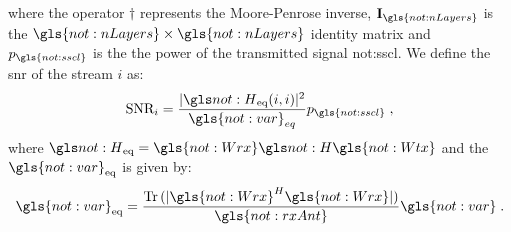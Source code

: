 \noindent where the operator $\dagger$ represents the Moore-Penrose inverse, $\mathbf{ I}_{\gls{not:nLayers}} $ is the $\gls{not:nLayers} \times \gls{not:nLayers}$ identity matrix and $p_{\gls{not:sscl}}$ is the the power of the transmitted signal \gls{not:sscl}.
%
We define the \gls{snr} of the stream $i$ as:
%
\begin{equation}
\label{eq.:snr}
\textrm{SNR}_i = \frac{ \abs{
		\channel_{\textrm{eq}} (i,i)
	}^2 }{\gls{not:var}_{eq}} p_{\gls{not:sscl}} \; ,
\end{equation}
%
where $\channel_{\textrm{eq}} = \gls{not:Wrx} \channel \gls{not:Wtx}$ and the $\gls{not:var}_{\textrm{eq}}$ is given by:
%
\begin{equation}
\gls{not:var}_{\textrm{eq}} = \frac{
	\Tr \,  (\abs{ \gls{not:Wrx}^H \gls{not:Wrx} } )}
{\gls{not:rxAnt}}
\gls{not:var} \;.
\end{equation}


